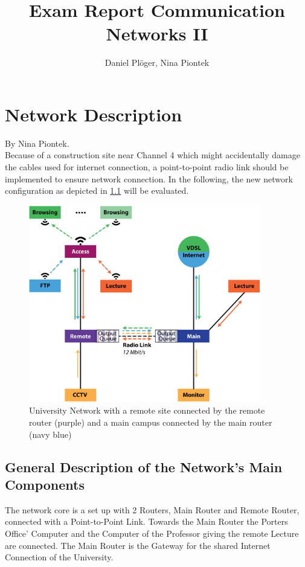 \documentclass[a4paper,10pt]{book}\usepackage{graphicx}
\title{Exam Report Communication Networks II}
\author{Daniel Plöger, Nina Piontek}
\begin{document}
\maketitle
\tableofcontents



\chapter{Network Description}
By Nina Piontek.\\

Because of a construction site near Channel 4 which might accidentally damage the cables 
used for internet connection,
a point-to-point radio link should be implemented to ensure network connection.
In the following, the new network configuration as depicted in \ref{fig:network} will be evaluated.
\begin{figure}[!ht]
  \begin{center}
    \includegraphics[width=0.9\textwidth]{graphics-03.eps}
    \caption{University Network with a remote site connected by the remote router (purple) and a main campus connected by the main router (navy blue)}
    \label{fig:network}
  \end{center}
\end{figure}

\section{General Description of the Network's Main Components}

The network core is a set up with 2 Routers, Main Router and Remote Router, connected with a Point-to-Point Link. 
Towards the Main Router the Porters Office' Computer and the Computer of the Professor giving the remote Lecture are connected.
The Main Router is the Gateway for the shared Internet Connection of the University.
\end{document}
